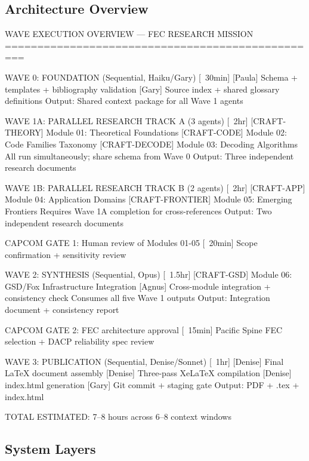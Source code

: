 \documentclass[11pt,letterpaper]{article}
\begin{document}
\subsection{Architecture Overview}

\begin{asciibox}
WAVE EXECUTION OVERVIEW --- FEC RESEARCH MISSION
=================================================

WAVE 0: FOUNDATION (Sequential, Haiku/Gary) [~30min]
  [Paula] Schema + templates + bibliography validation
  [Gary]  Source index + shared glossary definitions
  Output: Shared context package for all Wave 1 agents

WAVE 1A: PARALLEL RESEARCH TRACK A (3 agents) [~2hr]
  [CRAFT-THEORY] Module 01: Theoretical Foundations
  [CRAFT-CODE]   Module 02: Code Families Taxonomy
  [CRAFT-DECODE] Module 03: Decoding Algorithms
  All run simultaneously; share schema from Wave 0
  Output: Three independent research documents

WAVE 1B: PARALLEL RESEARCH TRACK B (2 agents) [~2hr]
  [CRAFT-APP]      Module 04: Application Domains
  [CRAFT-FRONTIER] Module 05: Emerging Frontiers
  Requires Wave 1A completion for cross-references
  Output: Two independent research documents

CAPCOM GATE 1: Human review of Modules 01-05 [~20min]
  Scope confirmation + sensitivity review

WAVE 2: SYNTHESIS (Sequential, Opus) [~1.5hr]
  [CRAFT-GSD]  Module 06: GSD/Fox Infrastructure Integration
  [Agnus]      Cross-module integration + consistency check
  Consumes all five Wave 1 outputs
  Output: Integration document + consistency report

CAPCOM GATE 2: FEC architecture approval [~15min]
  Pacific Spine FEC selection + DACP reliability spec review

WAVE 3: PUBLICATION (Sequential, Denise/Sonnet) [~1hr]
  [Denise] Final LaTeX document assembly
  [Denise] Three-pass XeLaTeX compilation
  [Denise] index.html generation
  [Gary]   Git commit + staging gate
  Output: PDF + .tex + index.html

TOTAL ESTIMATED: 7--8 hours across 6--8 context windows
\end{asciibox}

\subsection{System Layers}
\end{document}
